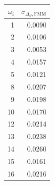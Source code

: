 \begin{tabular}{rr}
    \hline
    $\omega_i$ & $\sigma_{\Delta_{\omega}, \text{FMM}}$ \\
    \hline
    1          & 0.0090                                 \\
    2          & 0.0106                                 \\
    3          & 0.0053                                 \\
    4          & 0.0157                                 \\
    5          & 0.0121                                 \\
    8          & 0.0207                                 \\
    9          & 0.0198                                 \\
    10         & 0.0170                                 \\
    12         & 0.0214                                 \\
    13         & 0.0238                                 \\
    14         & 0.0260                                 \\
    15         & 0.0161                                 \\
    16         & 0.0216                                 \\
    \hline
\end{tabular}
